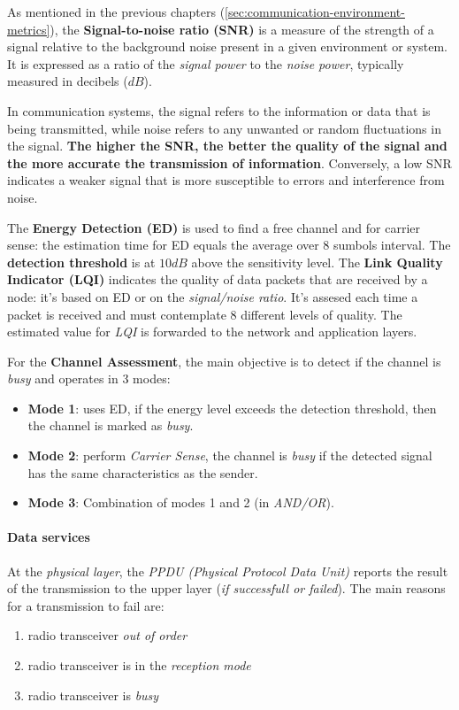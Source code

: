 \documentclass[10pt,a4paper]{report}
\theoremstyle{definition}
\begin{document}
As mentioned in the previous chapters (\ref{sec:communication-environment-metrics}), the \textbf{Signal-to-noise ratio (SNR)} is a measure of the strength of a signal relative to the background noise present in a given environment or system. It is expressed as a ratio of the \textit{signal power} to the \textit{noise power}, typically measured in decibels ($dB$).

In communication systems, the signal refers to the information or data that is being transmitted, while noise refers to any unwanted or random fluctuations in the signal. \textbf{The higher the SNR, the better the quality of the signal and the more accurate the transmission of information}. Conversely, a low SNR indicates a weaker signal that is more susceptible to errors and interference from noise.

The \textbf{Energy Detection (ED)} is used to find a free channel and for carrier sense: the estimation time for ED equals the average over 8 sumbols interval. The \textbf{detection threshold} is at $10dB$ above the sensitivity level.
The \textbf{Link Quality Indicator (LQI)} indicates the quality of data packets that are received by a node: it's based on ED or on the \textit{signal/noise ratio}. It's assesed each time a packet is received and must contemplate 8 different levels of quality.
The estimated value for \textit{LQI} is forwarded to the network and application layers.

For the \textbf{Channel Assessment}, the main objective is to detect if the channel is \textit{busy} and operates in 3 modes:
\begin{itemize}
	\item 
	\textbf{Mode 1}: uses ED, if the energy level exceeds the detection threshold, then the channel is marked as \textit{busy}.
	\item 
	\textbf{Mode 2}: perform \textit{Carrier Sense}, the channel is \textit{busy} if the detected signal has the same characteristics as the sender.
	\item 
	\textbf{Mode 3}: Combination of modes 1 and 2 (in \textit{AND/OR}).
\end{itemize}
\paragraph{Data services}\label{sec:data-services}
At the \textit{physical layer}, the \textit{PPDU (Physical Protocol Data Unit)} reports the result of the transmission to the upper layer (\textit{if successfull or failed}). The main reasons for a transmission to fail are:
\begin{enumerate}
	\item 
	radio transceiver \textit{out of order}
	\item 
	radio transceiver is in the \textit{reception mode}
	\item 
	radio transceiver is \textit{busy}
\end{enumerate}
\end{document}
